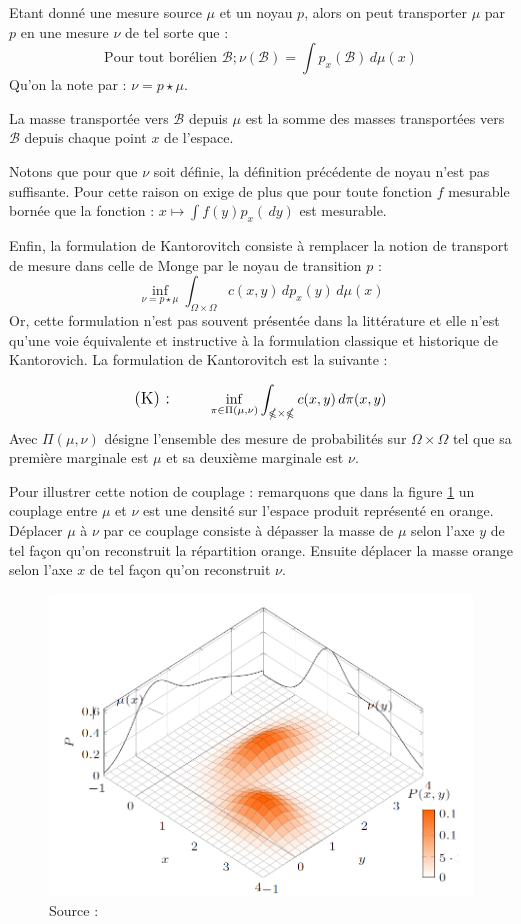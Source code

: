 \documentclass[
    8.2pt,
    a4paper,
    logo,
    twocolumn
]{template}
\begin{document}
    Etant donné une mesure source $\mu$ et un noyau $p$, alors on peut transporter $\mu$ par $p$ en une mesure $\nu$ de tel sorte que :
    \[
        \text{Pour tout borélien } \mathcal{B}; \nu(\mathcal{B}) = \int p_x(\mathcal{B}) \,d\mu(x)
    \]
    Qu'on la note par : $\nu = p \star \mu$.

    La masse transportée vers $\mathcal{B}$ depuis $\mu$ est la somme des masses transportées vers $\mathcal{B}$ depuis chaque point $x$ de l’espace.

    Notons que pour que $\nu$ soit définie, la définition précédente de noyau n’est pas suffisante. Pour cette raison on exige de plus que pour toute fonction $f$ mesurable bornée que la fonction : $x \mapsto \int f(y) p_x(\,dy)$ est mesurable.

    Enfin, la formulation de Kantorovitch consiste à remplacer la notion de transport de mesure  dans celle de Monge par le noyau de transition $p$ :
    \[
        \inf_{\nu = p \star \mu} \int_{\mathbb{\Omega \times \Omega}} c(x,y) \,dp_x(y) \,d\mu(x)
    \]
    Or, cette formulation n'est pas souvent présentée dans la littérature et elle n'est qu'une voie équivalente et instructive à la formulation classique et historique de Kantorovich.
    La formulation de Kantorovitch est la suivante :

    \begin{align*}
        \text{\large{(K) : \qquad}} &
            \inf_{\pi \in \Pi(\mu,\nu)} \int_{\mathbb{\Omega \times \Omega}} c(x,y) \,d\pi(x,y) \\
    \end{align*}
    Avec $\Pi(\mu,\nu)$ désigne l’ensemble des mesure de probabilités sur $\Omega \times \Omega$ tel que sa première marginale est $\mu$ et sa deuxième marginale est $\nu$.

    Pour illustrer cette notion de couplage : remarquons que dans la figure \ref{fig:figureh} un couplage entre $\mu$ et $\nu$ est une densité sur l’espace produit représenté en orange. \\
    Déplacer $\mu$ à $\nu$ par ce couplage consiste à dépasser la masse de $\mu$ selon l’axe $y$ de tel façon qu’on reconstruit la répartition orange. Ensuite déplacer la masse orange selon l’axe $x$ de tel façon qu’on reconstruit $\nu$.

    \begin{figure}[H]
        \centering
        \includegraphics[width=.5\textwidth]{figures/Image4.png}
        \caption{Source : \citep{cuturi_fast_nodate}}
        \label{fig:figureh}
    \end{figure}
\end{document}
